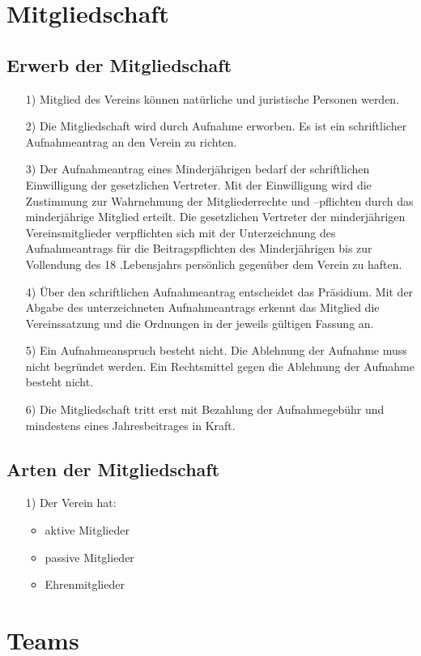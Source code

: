 \documentclass[11pt,a4paper]{scrartcl}
\begin{document}

\section{Mitgliedschaft}\label{sec:mitgliedschaft}
\setcounter{subsection}{2}
\subsection{Erwerb der Mitgliedschaft}
\begin{itemize}
    \item[1)] Mitglied des Vereins k\"onnen nat\"urliche und juristische Personen werden.
    \item[2)] Die Mitgliedschaft wird durch Aufnahme erworben. Es ist ein schriftlicher Aufnahmeantrag an den Verein zu richten. 
    \item[3)] Der Aufnahmeantrag eines Minderj\"ahrigen bedarf der schriftlichen Einwilligung der gesetzlichen Vertreter. Mit der Einwilligung wird die Zustimmung zur Wahr\-neh\-mung der Mitgliederrechte  und –pflichten durch das minderj\"ahrige  Mitglied erteilt. Die  gesetzlichen Vertreter der  minderj\"ahrigen Vereinsmitglieder verpflichten sich mit der Unterzeichnung des Aufnahmeantrags f\"ur  die Beitragspflichten des  Minderj\"ahrigen bis zur Vollendung des 18 .Lebensjahrs pers\"onlich gegenüber dem Verein zu haften. 
    \item[4)] \"Uber den schriftlichen Aufnahmeantrag entscheidet das Präsidium. Mit der Abgabe  des unterzeichneten Aufnahmeantrags erkennt das Mitglied die Vereinssatzung und die Ordnungen in der jeweils g\"ultigen Fassung an.
    \item[5)] Ein  Aufnahmeanspruch  besteht  nicht.  Die  Ablehnung  der  Aufnahme  muss  nicht  begr\"undet werden. Ein Rechtsmittel gegen die Ablehnung der Aufnahme besteht nicht.
    \item[6)] Die Mitgliedschaft tritt erst mit Bezahlung der Aufnahmegebühr und mindestens eines Jahresbeitrages in Kraft.
\end{itemize}

\subsection{Arten der Mitgliedschaft}
 \begin{itemize}
    \item[1)] Der Verein hat:
    \begin{itemize}
        \item aktive Mitglieder
        \item passive Mitglieder
        \item Ehrenmitglieder
    \end{itemize}
 \end{itemize}

\section{Teams}\label{sec:teams}
\end{document}
